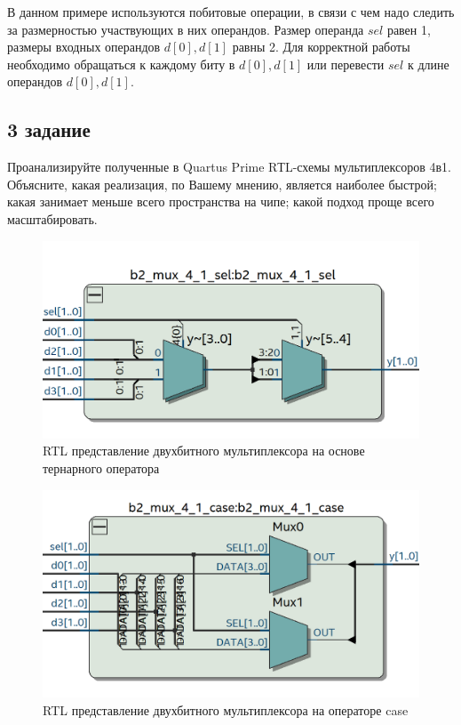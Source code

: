 \documentclass[a4paper,14pt]{article}
\begin{document}

В данном примере используются побитовые операции, в связи с чем
надо следить за размерностью участвующих в них операндов. Размер операнда $sel$ равен 1, размеры входных операндов $d[0],d[1]$ равны 2. Для корректной работы необходимо обращаться к каждому биту в $d[0],d[1]$ или перевести $sel$ к длине операндов $d[0],d[1]$.

\subsection{3 задание}

Проанализируйте полученные в Quartus Prime RТL-схемы мультиплексоров 4в1. Объясните, какая реализация, по Вашему мнению, является наиболее быстрой;  какая занимает меньше всего пространства на чипе; какой подход проще всего масштабировать.


\begin{figure}[H]
 	\centering
 	\includegraphics[width=0.6\linewidth]{img/z3_rtl_sel}
 	\caption{RTL представление двухбитного мультиплексора на основе тернарного оператора}
 	\label{fig:z3_rtl_sel}
\end{figure}


\begin{figure}[H]
	\centering
	\includegraphics[width=0.6\linewidth]{img/z3_rtl_case}
	\caption{RTL представление двухбитного мультиплексора на операторе case}
	\label{fig:z3_rtl_case}
\end{figure}
\end{document}
